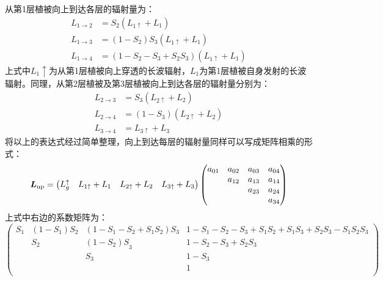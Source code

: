 从第1层植被向上到达各层的辐射量为：
\begin{equation}
\begin{aligned}
L_{1 \rightarrow 2} &=S_{2}\left(L_{1 \uparrow}+L_{1}\right) \\[1ex]
L_{1 \rightarrow 3} &=\left(1-S_{2}\right) S_{3}\left(L_{1 \uparrow}+L_{1}\right) \\[1ex]
L_{1 \rightarrow 4} &=\left(1-S_{2}-S_{3}+S_{2} S_{3}\right)\left(L_{1 \uparrow}+L_{1}\right)
\end{aligned}
\end{equation}
上式中$L_1\uparrow$为从第1层植被向上穿透的长波辐射，$L_1$为第1层植被自身发射的长波辐射。同理，从第2层植被及第3层植被向上到达各层的辐射量分别为：
\begin{equation}
\begin{aligned}
L_{2 \rightarrow 3} &=S_{3}\left(L_{2 \uparrow}+L_{2}\right) \\[1ex]
L_{2 \rightarrow 4} &=\left(1-S_{3}\right)\left(L_{2 \uparrow}+L_{2}\right) \\[1ex] 
L_{3 \rightarrow 4} &=L_{3 \uparrow}+L_{3} 
\end{aligned}
\end{equation}
将以上的表达式经过简单整理，向上到达每层的辐射量同样可以写成矩阵相乘的形式：
\begin{equation}
\boldsymbol {L}_{\rm up}=\left(\begin{matrix}L_g ^\uparrow &L_{1\uparrow}+L_1&L_{2\uparrow}+L_2&L_{3\uparrow}+L_3\\\end{matrix}
\right)\left(\begin{matrix}a_{01}&a_{02}&a_{03}&a_{04}\\&a_{12}&a_{13}&a_{14}\\
&&a_{23}&a_{24}\\&&&a_{34}
\\\end{matrix}\right)
\end{equation}
上式中右边的系数矩阵为：
\begin{equation}
\left(\begin{matrix}S_1&\left(1-S_1\right)S_2&\left(1-S_1-S_2+S_1S_2\right)S_3&
    1-S_1-S_2-S_3+S_1S_2+S_1S_3+S_2S_3-S_1S_2S_3\\&S_2&{\left(1-S_2\right)S}_3&1-S_2-S_3+S_2S_3\\
    &&S_3&1-S_3\\&&&1\\\end{matrix}\right)   
\end{equation}

